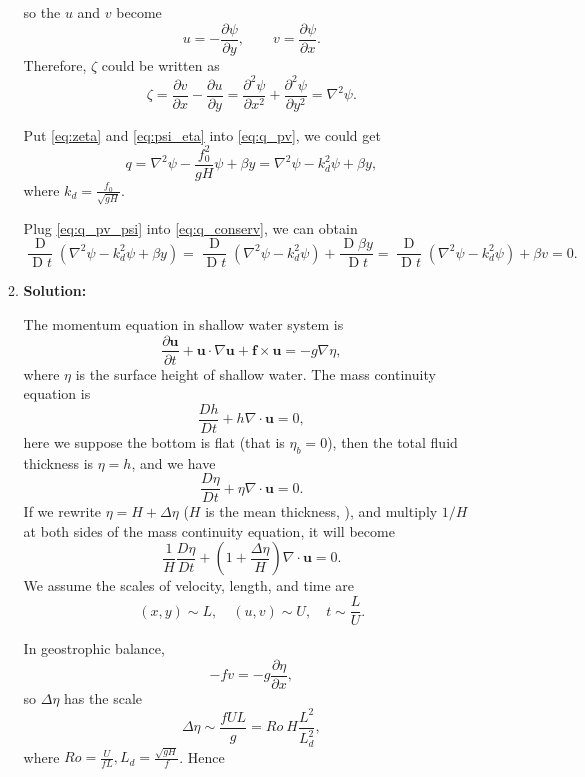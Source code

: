 \documentclass[a4paper]{article}
\begin{document}
\begin{enumerate}[label=\textbf{\arabic*.}]
\begin{enumerate}[label=\textbf{(\alph*)}]
	so the $u$ and $v$ become 
	$$u = -\frac{\partial \psi}{\partial y}, \qquad v = \frac{\partial \psi}{\partial x}.$$
	Therefore, $\zeta$ could be written as
	\begin{equation}\label{eq:zeta}
	\zeta=\frac{\partial v}{\partial x}-\frac{\partial u}{\partial y}=\frac{\partial^2 \psi}{\partial x^2}+\frac{\partial^2 \psi}{\partial y^2}=\nabla ^2\psi.
	\end{equation}
	
	Put \eqref{eq:zeta} and \eqref{eq:psi_eta} into \eqref{eq:q_pv}, we could get
	\begin{equation}\label{eq:q_pv_psi}
		q= \nabla^2\psi-\frac{f_0^2}{gH}\psi+\beta y= \nabla^2\psi-k_d^2\psi+\beta y,
	\end{equation}
	where $k_d = \frac{f_0}{\sqrt{gH}}$.
	
	Plug \eqref{eq:q_pv_psi} into \eqref{eq:q_conserv}, we can obtain
	$$\frac{\operatorname{D} }{\operatorname{D}t}(\nabla^2\psi-k_d^2\psi+\beta y)=\frac{\operatorname{D} }{\operatorname{D}t}(\nabla^2\psi-k_d^2\psi)+\frac{\operatorname{D} \beta y}{\operatorname{D}t}=\frac{\operatorname{D} }{\operatorname{D}t}(\nabla^2\psi-k_d^2\psi)+\beta v = 0.$$
	
	\item \textbf{Solution:} 
	
	The momentum equation in shallow water system is 
	\begin{equation}\label{eq:sw_mom}
		\frac { \partial \bm u } { \partial t } + \bm u \cdot \nabla \bm u + \bm f \times \bm u = - g \nabla \eta,
	\end{equation}
	where $\eta$ is the surface height of shallow water. The mass continuity equation is
	$$\frac { D h } { D t } + h \nabla \cdot \bm u = 0,$$
	here we suppose the bottom is flat (that is $\eta_b = 0$), then the total fluid thickness is $\eta =h$, and we have
	$$\frac { D \eta } { D t } + \eta \nabla \cdot \bm u = 0.$$
	If we rewrite $\eta =H+\Delta \eta$ ($H$ is the mean thickness, ), and multiply $1/H$ at both sides of the mass continuity equation, it will become
	\begin{equation}\label{eq:sw_mass}
		\frac { 1} { H } \frac { D \eta } { D t } + \left( 1+ \frac { \Delta \eta } { H } \right) \nabla \cdot \bm u = 0.
	\end{equation}
	We assume the scales of velocity, length, and time are
	$$ ( x ,y ) \sim L ,\quad   ( u ,v ) \sim U, \quad t\sim \frac{L}{U}.$$
	
	In geostrophic balance,
	$$-fv= -g\frac{\partial \eta}{\partial x},$$
	so $\Delta \eta $ has the scale 
		$$\Delta \eta\sim \frac{fUL}{g}=Ro ~H \frac{L^2}{L_d^2},$$
	where $Ro=\frac{U}{fL}, L_d=\frac{\sqrt{gH}}{f}$. Hence


\end{enumerate}
\end{enumerate}
\end{document}
